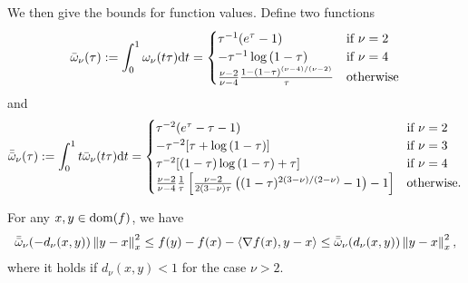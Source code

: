 We then give the bounds for function values.
Define two functions
\begin{align}\label{eq:bar_omega}
    \bar \omega_\nu(\tau) := \int_0^1 \omega_\nu(t \tau) \mathrm{d} t =
    \begin{cases}
        \tau^{-1} (e^\tau - 1) & \mbox{if } \nu = 2 \\
        -\tau^{-1} \log{(1 - \tau)} & \mbox{if } \nu = 4 \\
        \frac{\nu - 2}{\nu - 4} \frac{1 - (1 - \tau)^{(\nu-4)/(\nu-2)}}{\tau} & \mbox{otherwise}
    \end{cases}
\end{align}
and
\begin{align}
    \bar{\bar{\omega}}_\nu(\tau) := \int_0^1 t \bar \omega_\nu(t \tau) \mathrm{d} t =
    \begin{cases}
        \tau^{-2} (e^\tau - \tau - 1) & \mbox{if } \nu = 2 \\
        -\tau^{-2} [\tau + \log{(1 - \tau)}] & \mbox{if } \nu = 3 \\
        \tau^{-2} [(1 - \tau) \log{(1 - \tau)} + \tau] & \mbox{if } \nu = 4 \\
        \frac{\nu - 2}{\nu - 4} \frac1\tau \left[ \frac{\nu - 2}{2(3 - \nu) \tau} \left( (1 - \tau)^{2(3-\nu)/(2-\nu)} - 1 \right) - 1 \right] & \mbox{otherwise}.
    \end{cases}
\end{align}

\begin{proposition}
\label{prop:function_value}
    For any $x, y \in \operatorname{dom}(f)$, we have
    \begin{align*}
        \bar{\bar{\omega}}_\nu(-d_\nu(x,y)) \left\lVert y - x \right\rVert_x^2 \le f(y) - f(x) - {\langle \nabla f(x), y - x \rangle} \le \bar{\bar{\omega}}_\nu(d_\nu(x, y)) \left\lVert y - x \right\rVert_x^2,
    \end{align*}
    where it holds if $d_\nu(x, y) < 1$ for the case $\nu > 2$.
\end{proposition}


